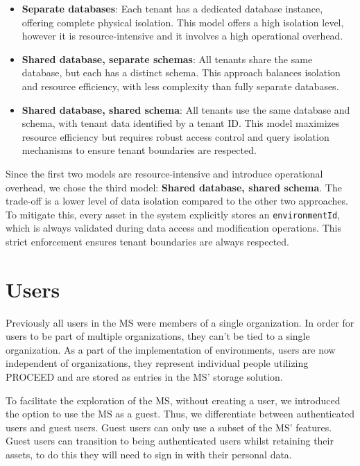 \begin{itemize}
  \item \textbf{Separate databases}: Each tenant has a dedicated database instance,
    offering complete physical isolation.
    This model offers a high isolation level,
    however it is resource-intensive and it involves a high operational overhead.

  \item \textbf{Shared database, separate schemas}: All tenants share the same database, but each has a distinct schema. 
      This approach balances isolation and resource efficiency, with less complexity than fully separate databases.

  \item \textbf{Shared database, shared schema}: All tenants use the same database and schema, with tenant data identified by a tenant ID. This model maximizes resource efficiency but requires robust access control and query isolation mechanisms to ensure tenant boundaries are respected.
\end{itemize}

Since the first two models are resource-intensive and introduce operational
overhead, we chose the third model: \textbf{Shared database, shared schema}.
The trade-off is a lower level of data isolation compared to the other two approaches.
To mitigate this, every asset in the system explicitly stores an \lstinline{environmentId},
which is always validated during data access and modification operations.
This strict enforcement ensures tenant boundaries are always respected.


\section{Users}
\label{cha:conceptanddesign:users}

Previously all users in the MS were members of a single organization.
In order for users to be part of multiple organizations, they can't be tied to a single
organization.
As a part of the implementation of environments, users are now independent of
organizations,
they represent individual people utilizing PROCEED and are stored as entries in
the MS' storage solution.

To facilitate the exploration of the MS, without creating a user, we introduced the option
to use the MS as a guest.
Thus, we differentiate between authenticated users and guest users.
Guest users can only use a subset of the MS' features.
Guest users can transition to being authenticated users whilst retaining their
assets, to do this they will need to sign in with their personal data.

